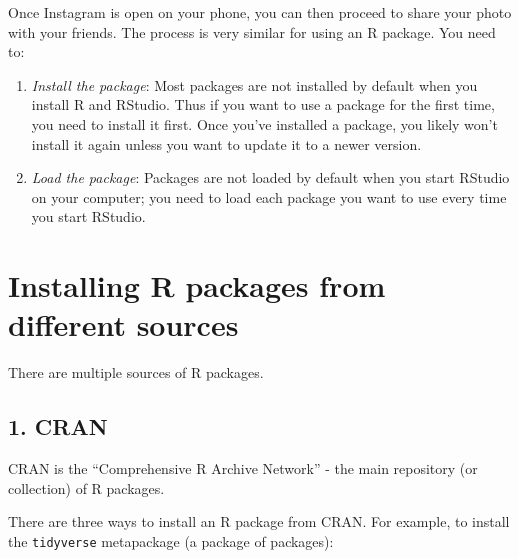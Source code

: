 \documentclass[
]{book}
\providecommand{\tightlist}{%
  \setlength{\itemsep}{0pt}\setlength{\parskip}{0pt}}
\begin{document}
Once Instagram is open on your phone, you can then proceed to share your photo with your friends. The process is very similar for using an R package. You need to:

\begin{enumerate}
\def\labelenumi{\arabic{enumi}.}
\tightlist
\item
  \emph{Install the package}: Most packages are not installed by default when you install R and RStudio. Thus if you want to use a package for the first time, you need to install it first. Once you've installed a package, you likely won't install it again unless you want to update it to a newer version.\\
\item
  \emph{Load the package}: Packages are not loaded by default when you start RStudio on your computer; you need to load each package you want to use every time you start RStudio.
\end{enumerate}

\section{Installing R packages from different sources}\label{installing-r-packages-from-different-sources}

There are multiple sources of R packages.

\subsection*{1. CRAN}\label{cran}

CRAN is the ``Comprehensive R Archive Network'' - the main repository (or collection) of R packages.

There are three ways to install an R package from CRAN. For example, to install the \texttt{tidyverse} metapackage (a package of packages):
\end{document}
